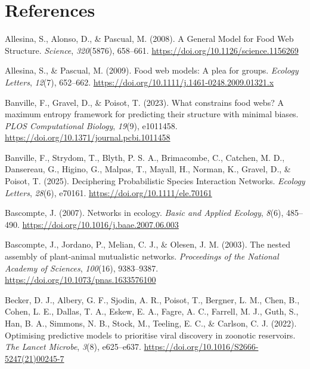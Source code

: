 \documentclass[
]{article}
\newlength{\cslhangindent}
\newenvironment{CSLReferences}[2] %
 {\begin{list}{}{%
  \setlength{\itemindent}{0pt}
  \setlength{\leftmargin}{0pt}
  \setlength{\parsep}{0pt}
  \ifodd #1
   \setlength{\leftmargin}{\cslhangindent}
   \setlength{\itemindent}{-1\cslhangindent}
  \fi
  \setlength{\itemsep}{#2\baselineskip}}}
 {\end{list}}
\begin{document}
\section*{References}\label{references}

\label{refs}
\begin{CSLReferences}{1}{0}
Allesina, S., Alonso, D., \& Pascual, M. (2008). A {General Model} for
{Food Web Structure}. \emph{Science}, \emph{320}(5876), 658--661.
\url{https://doi.org/10.1126/science.1156269}

Allesina, S., \& Pascual, M. (2009). Food web models: A plea for groups.
\emph{Ecology Letters}, \emph{12}(7), 652--662.
\url{https://doi.org/10.1111/j.1461-0248.2009.01321.x}

Banville, F., Gravel, D., \& Poisot, T. (2023). What constrains food
webs? {A} maximum entropy framework for predicting their structure with
minimal biases. \emph{PLOS Computational Biology}, \emph{19}(9),
e1011458. \url{https://doi.org/10.1371/journal.pcbi.1011458}

Banville, F., Strydom, T., Blyth, P. S. A., Brimacombe, C., Catchen, M.
D., Dansereau, G., Higino, G., Malpas, T., Mayall, H., Norman, K.,
Gravel, D., \& Poisot, T. (2025). Deciphering {Probabilistic Species
Interaction Networks}. \emph{Ecology Letters}, \emph{28}(6), e70161.
\url{https://doi.org/10.1111/ele.70161}

Bascompte, J. (2007). Networks in ecology. \emph{Basic and Applied
Ecology}, \emph{8}(6), 485--490.
\url{https://doi.org/10.1016/j.baae.2007.06.003}

Bascompte, J., Jordano, P., Melian, C. J., \& Olesen, J. M. (2003). The
nested assembly of plant-animal mutualistic networks. \emph{Proceedings
of the National Academy of Sciences}, \emph{100}(16), 9383--9387.
\url{https://doi.org/10.1073/pnas.1633576100}

Becker, D. J., Albery, G. F., Sjodin, A. R., Poisot, T., Bergner, L. M.,
Chen, B., Cohen, L. E., Dallas, T. A., Eskew, E. A., Fagre, A. C.,
Farrell, M. J., Guth, S., Han, B. A., Simmons, N. B., Stock, M.,
Teeling, E. C., \& Carlson, C. J. (2022). Optimising predictive models
to prioritise viral discovery in zoonotic reservoirs. \emph{The Lancet
Microbe}, \emph{3}(8), e625--e637.
\url{https://doi.org/10.1016/S2666-5247(21)00245-7}


\end{CSLReferences}
\end{document}
